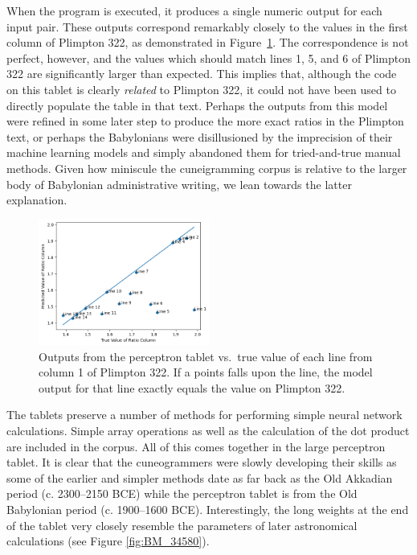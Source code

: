 \documentclass[11pt]{article}
\begin{document}
When the program is executed, it produces a single numeric output for each input pair. 
These outputs correspond remarkably closely to the values in the first column of Plimpton 322, as demonstrated in Figure~\ref{fig:graph}.
The correspondence is not perfect, however, and the values which should match lines 1, 5, and 6 of Plimpton 322 are significantly larger than expected.
This implies that, although the code on this tablet is clearly \textit{related} to Plimpton 322, it could not have been used to directly populate the table in that text.
Perhaps the outputs from this model were refined in some later step to produce the more exact ratios in the Plimpton text, or perhaps the Babylonians were disillusioned by the imprecision of their machine learning models and simply abandoned them for tried-and-true manual methods. 
Given how miniscule the cuneigramming corpus is relative to the larger body of Babylonian administrative writing, we lean towards the latter explanation.



\begin{figure}\label{fig:graph}
    \includegraphics[width=0.5\textwidth]{graph.png}
    \caption{Outputs from the perceptron tablet vs.\ true value of each line from column 1 of Plimpton 322. If a points falls upon the line, the model output for that line exactly equals the value on Plimpton 322.}
    \label{fig:graph}
\end{figure}

The tablets preserve a number of methods for performing simple neural network calculations.
Simple array operations as well as the calculation of the dot product are included in the corpus.
All of this comes together in the large perceptron tablet.
It is clear that the cuneogrammers were slowly developing their skills as some of the earlier and simpler methods date as far back as the Old Akkadian period (c. 2300--2150 BCE) while the perceptron tablet is from the Old Babylonian period (c. 1900--1600 BCE).
Interestingly, the long weights at the end of the tablet very closely resemble the parameters of later astronomical calculations (see Figure \ref{fig:BM_34580}).
\end{document}
